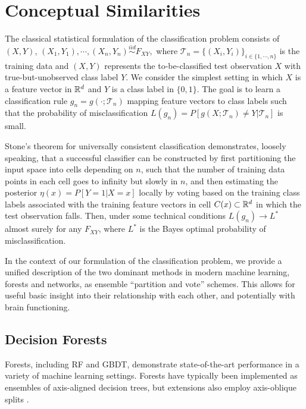 
\section{Conceptual Similarities}
The classical statistical formulation of the classification problem consists of $(X,Y)$, $(X_1,Y_1), \cdots, (X_n,Y_n) \stackrel{iid}{\sim} F_{XY},$ where $\mathcal{T}_n = \{(X_i,Y_i)\}_{i \in \{1,\cdots,n\}}$ is the training data and $(X,Y)$ represents the to-be-classified test observation $X$ with true-but-unobserved class label $Y$. We consider the simplest setting in which $X$ is a feature vector in $\mathbb{R}^d$ and $Y$ is a class label in $\{0,1\}$. The goal is to learn a classification rule $g_n = g(\cdot;\mathcal{T}_n)$ mapping feature vectors to class labels such that the probability of misclassification $L(g_n) = P[g(X;\mathcal{T}_n) \neq Y|\mathcal{T}_n]$ is small.

Stone's theorem for universally consistent classification \citep{Stone1977, DGL} demonstrates, loosely speaking, that a successful classifier can be constructed by first partitioning the input space into cells depending on $n$, such that the number of training data points in each cell goes to infinity but slowly in $n$, and then estimating the posterior 
$\eta(x) = P[Y=1|X=x]$ locally by voting based on the training class labels associated with the training feature vectors in cell $C(x) \subset \mathbb{R}^d$ in which the test observation falls.
Then, under some technical conditions $L(g_n) \to L^*$ almost surely for any $F_{XY}$, where $L^*$ is the Bayes optimal probability of misclassification.

In the context of our formulation of the classification problem,
we provide a unified description of the two dominant methods in modern machine learning, forests and networks, as ensemble ``partition and vote'' schemes.
This allows for useful basic insight into their relationship with each other, and potentially with brain functioning.

\subsection{Decision Forests}
Forests, including RF and GBDT, demonstrate state-of-the-art performance in a variety of machine learning settings.
Forests have typically been implemented as ensembles of axis-aligned decision trees, but extensions also employ axis-oblique splits \citep{Breiman2001, Tomita2017-mv, sporf}.

